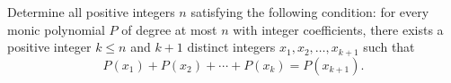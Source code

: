 Determine all positive integers $n$ satisfying the following condition:
for every monic polynomial $P$ of degree at most $n$ with integer coefficients, there exists a positive integer $k\le n$ and $k+1$ distinct integers $x_1,x_2,\dots ,x_{k+1}$ such that \[P(x_1)+P(x_2)+\cdots +P(x_k)=P(x_{k+1}).\]

